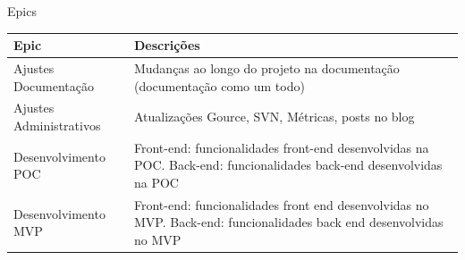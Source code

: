 \documentclass[
    12pt,               %
    openright,          %
    oneside,
    a4paper,            %
    BIBLATEX,           %
    TODO,               %
    english,            %
    brazil              %
    ]{ifsp-spo-inf-ctds}
\begin{document}
    
 \begin{center}
      \begin{quadro}[H]
      \centering
          \caption{Epics}
          \begin{tabulary}{1.0\textwidth}{|p{12em}|p{25em}|}
        \hline
       Epic & Descrições  \\
        \hline
        Ajustes Documentação & Mudanças ao longo do projeto na documentação (documentação como um todo)\\
        \hline
        Ajustes Administrativos & Atualizações Gource, SVN, Métricas, posts no blog\\
        \hline
        Desenvolvimento POC & Front-end: funcionalidades front-end desenvolvidas na POC.
        Back-end: funcionalidades back-end desenvolvidas na POC\\
        \hline
        Desenvolvimento MVP & Front-end: funcionalidades front end desenvolvidas no MVP.
      Back-end: funcionalidades back end desenvolvidas no MVP\\
        \hline
        \end{tabulary}
          \label{qd: epic}
      \end{quadro}
    \end{center}
    
\end{document}
